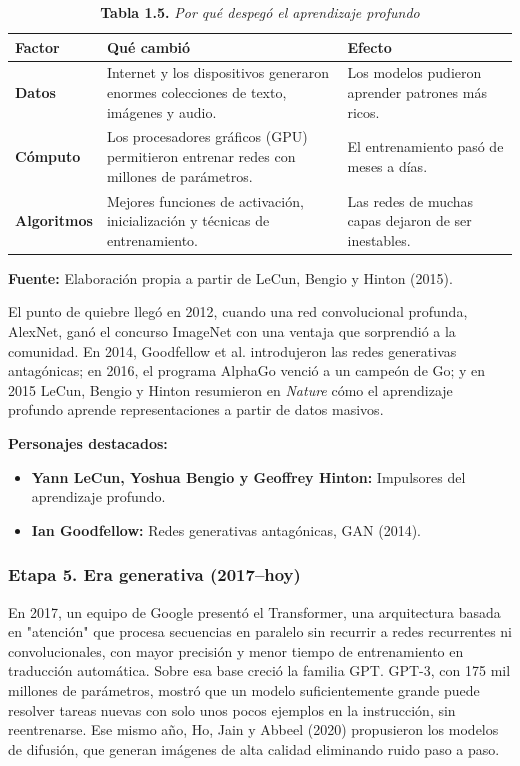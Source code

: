 \begin{table}[htpb!]
\centering
\small\sffamily
\caption{\textbf{Tabla 1.5.} \textit{Por qué despegó el aprendizaje profundo}}
\vspace{0.15cm}
\begin{tabularx}{\textwidth}{>{\bfseries}p{2.5cm} >{\raggedright\arraybackslash}p{6.5cm} >{\raggedright\arraybackslash}X}
\toprule
Factor & Qué cambió & Efecto \\
\midrule
Datos & Internet y los dispositivos generaron enormes colecciones de texto, imágenes y audio. & Los modelos pudieron aprender patrones más ricos. \\
\midrule
Cómputo & Los procesadores gráficos (GPU) permitieron entrenar redes con millones de parámetros. & El entrenamiento pasó de meses a días. \\
\midrule
Algoritmos & Mejores funciones de activación, inicialización y técnicas de entrenamiento. & Las redes de muchas capas dejaron de ser inestables. \\
\bottomrule
\end{tabularx}
\vspace{0.15cm}
\raggedright\scriptsize \textbf{Fuente:} Elaboración propia a partir de LeCun, Bengio y Hinton (2015).
\end{table}

El punto de quiebre llegó en 2012, cuando una red convolucional profunda, AlexNet, ganó el concurso ImageNet con una ventaja que sorprendió a la comunidad. En 2014, Goodfellow et al. introdujeron las redes generativas antagónicas; en 2016, el programa AlphaGo venció a un campeón de Go; y en 2015 LeCun, Bengio y Hinton resumieron en \textit{Nature} cómo el aprendizaje profundo aprende representaciones a partir de datos masivos.

\textbf{Personajes destacados:}
\begin{itemize}
    \item \textbf{Yann LeCun, Yoshua Bengio y Geoffrey Hinton:} Impulsores del aprendizaje profundo.
    \item \textbf{Ian Goodfellow:} Redes generativas antagónicas, GAN (2014).
\end{itemize}

\subsubsection{Etapa 5. Era generativa (2017--hoy)}
En 2017, un equipo de Google presentó el Transformer, una arquitectura basada en "atención" que procesa secuencias en paralelo sin recurrir a redes recurrentes ni convolucionales, con mayor precisión y menor tiempo de entrenamiento en traducción automática. Sobre esa base creció la familia GPT. GPT-3, con 175 mil millones de parámetros, mostró que un modelo suficientemente grande puede resolver tareas nuevas con solo unos pocos ejemplos en la instrucción, sin reentrenarse. Ese mismo año, Ho, Jain y Abbeel (2020) propusieron los modelos de difusión, que generan imágenes de alta calidad eliminando ruido paso a paso.

